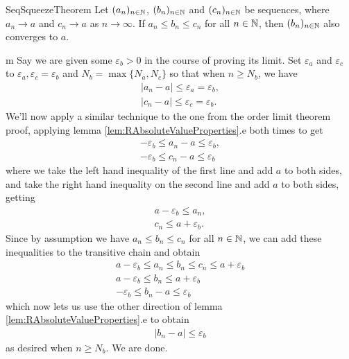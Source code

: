 \documentclass[11pt]{article}
\begin{document}
\begin{label theorem}{SeqSqueezeTheorem}
Let $(a_n)_{n\in \mathbb{N}}$, $(b_n)_{n\in \mathbb{N}}$ and $(c_n)_{n\in \mathbb{N}}$ be sequences, where $a_n \to a$ and $c_n \to a$ as $n\to \infty$. If $a_n \le b_n \le c_n$ for all $n\in \mathbb{N}$, then $(b_n)_{n\in \mathbb{N}}$ also converges to $a$.
\end{label theorem}

\begin{my proof}{m}
Say we are given some $\varepsilon_b > 0$ in the course of proving its limit. Set $\varepsilon_a$ and $\varepsilon_c$ to $\varepsilon_a,\varepsilon_c = \varepsilon_b$ and $N_b = \max\{N_a,N_c\}$ so that when $n \ge N_b$, we have \begin{gather*}
|a_n - a| \le \varepsilon_a = \varepsilon_b, \\
|c_n - a| \le \varepsilon_c = \varepsilon_b.
\end{gather*}
We'll now apply a similar technique to the one from the order limit theorem proof, applying lemma \ref{lem:RAbsoluteValueProperties}.e both times to get \begin{gather*}
- \varepsilon_b \le a_n - a \le \varepsilon_b, \\
- \varepsilon_b \le c_n - a \le \varepsilon_b
\end{gather*}
where we take the left hand inequality of the first line and add $a$ to both sides, and take the right hand inequality on the second line and add $a$ to both sides, getting \begin{gather*}
a - \varepsilon_b \le a_n, \\
c_n \le a + \varepsilon_b.
\end{gather*}
Since by assumption we have $a_n \le b_n \le c_n$ for all $n\in \mathbb{N}$, we can add these inequalities to the transitive chain and obtain \begin{gather*}
a - \varepsilon_b \le a_n \le b_n \le c_n \le a + \varepsilon_b \\
a - \varepsilon_b \le  b_n \le a + \varepsilon_b \\
- \varepsilon_b \le  b_n - a\le  \varepsilon_b
\end{gather*}
which now lets us use the other direction of lemma \ref{lem:RAbsoluteValueProperties}.e to obtain \begin{gather*}
|b_n - a| \le \varepsilon_b
\end{gather*}
as desired when $n \ge N_b$. We are done.
\end{my proof}
\end{document}
